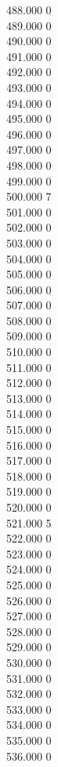 { 488.000	0 \\
 489.000	0 \\
 490.000	0 \\
 491.000	0 \\
 492.000	0 \\
 493.000	0 \\
 494.000	0 \\
 495.000	0 \\
 496.000	0 \\
 497.000	0 \\
 498.000	0 \\
 499.000	0 \\
 500.000	7 \\
 501.000	0 \\
 502.000	0 \\
 503.000	0 \\
 504.000	0 \\
 505.000	0 \\
 506.000	0 \\
 507.000	0 \\
 508.000	0 \\
 509.000	0 \\
 510.000	0 \\
 511.000	0 \\
 512.000	0 \\
 513.000	0 \\
 514.000	0 \\
 515.000	0 \\
 516.000	0 \\
 517.000	0 \\
 518.000	0 \\
 519.000	0 \\
 520.000	0 \\
 521.000	5 \\
 522.000	0 \\
 523.000	0 \\
 524.000	0 \\
 525.000	0 \\
 526.000	0 \\
 527.000	0 \\
 528.000	0 \\
 529.000	0 \\
 530.000	0 \\
 531.000	0 \\
 532.000	0 \\
 533.000	0 \\
 534.000	0 \\
 535.000	0 \\
 536.000	0 \\
}
